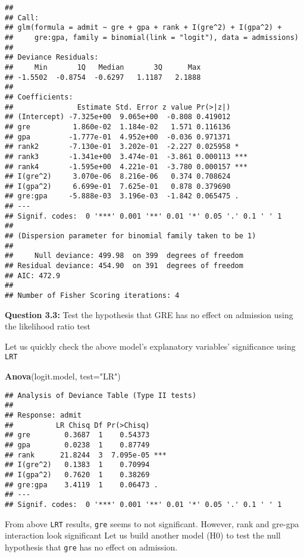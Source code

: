 \documentclass[]{article}
\newenvironment{Shaded}{\begin{snugshade}}{\end{snugshade}}
\newcommand{\DataTypeTok}[1]{\textcolor[rgb]{0.13,0.29,0.53}{#1}}
\newcommand{\KeywordTok}[1]{\textcolor[rgb]{0.13,0.29,0.53}{\textbf{#1}}}
\newcommand{\NormalTok}[1]{#1}
\newcommand{\StringTok}[1]{\textcolor[rgb]{0.31,0.60,0.02}{#1}}
\begin{document}
\begin{verbatim}
## 
## Call:
## glm(formula = admit ~ gre + gpa + rank + I(gre^2) + I(gpa^2) + 
##     gre:gpa, family = binomial(link = "logit"), data = admissions)
## 
## Deviance Residuals: 
##     Min       1Q   Median       3Q      Max  
## -1.5502  -0.8754  -0.6297   1.1187   2.1888  
## 
## Coefficients:
##               Estimate Std. Error z value Pr(>|z|)    
## (Intercept) -7.325e+00  9.065e+00  -0.808 0.419012    
## gre          1.860e-02  1.184e-02   1.571 0.116136    
## gpa         -1.777e-01  4.952e+00  -0.036 0.971371    
## rank2       -7.130e-01  3.202e-01  -2.227 0.025958 *  
## rank3       -1.341e+00  3.474e-01  -3.861 0.000113 ***
## rank4       -1.595e+00  4.221e-01  -3.780 0.000157 ***
## I(gre^2)     3.070e-06  8.216e-06   0.374 0.708624    
## I(gpa^2)     6.699e-01  7.625e-01   0.878 0.379690    
## gre:gpa     -5.888e-03  3.196e-03  -1.842 0.065475 .  
## ---
## Signif. codes:  0 '***' 0.001 '**' 0.01 '*' 0.05 '.' 0.1 ' ' 1
## 
## (Dispersion parameter for binomial family taken to be 1)
## 
##     Null deviance: 499.98  on 399  degrees of freedom
## Residual deviance: 454.90  on 391  degrees of freedom
## AIC: 472.9
## 
## Number of Fisher Scoring iterations: 4
\end{verbatim}

\textbf{Question 3.3:} Test the hypothesis that GRE has no effect on
admission using the likelihood ratio test

Let us quickly check the above model's explanatory variables'
significance using \texttt{LRT}

\begin{Shaded}
\begin{Highlighting}[]
\KeywordTok{Anova}\NormalTok{(logit.model, }\DataTypeTok{test=}\StringTok{"LR"}\NormalTok{)}
\end{Highlighting}
\end{Shaded}

\begin{verbatim}
## Analysis of Deviance Table (Type II tests)
## 
## Response: admit
##          LR Chisq Df Pr(>Chisq)    
## gre        0.3687  1    0.54373    
## gpa        0.0238  1    0.87749    
## rank      21.8244  3  7.095e-05 ***
## I(gre^2)   0.1383  1    0.70994    
## I(gpa^2)   0.7620  1    0.38269    
## gre:gpa    3.4119  1    0.06473 .  
## ---
## Signif. codes:  0 '***' 0.001 '**' 0.01 '*' 0.05 '.' 0.1 ' ' 1
\end{verbatim}

From above \texttt{LRT} results, \texttt{gre} seems to not significant.
However, rank and gre-gpa interaction look significant Let us build
another model (H0) to test the null hypothesis that \texttt{gre} has no
effect on admission.
\end{document}
